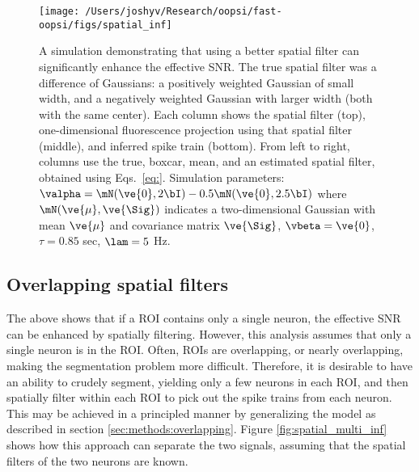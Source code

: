 \begin{figure}[h!]
\centering \texttt{[image: /Users/joshyv/Research/oopsi/fast-oopsi/figs/spatial\_inf]}
\caption[spatial filtering can improve effective SNR]{A simulation demonstrating that using a better spatial filter can significantly enhance the effective SNR. The true spatial filter was a difference of Gaussians: a positively weighted Gaussian of small width, and a negatively weighted Gaussian with larger width (both with the same center).  Each column shows the spatial filter (top), one-dimensional fluorescence projection using that spatial filter (middle), and inferred spike train (bottom).  From left to right, columns use the true, boxcar, mean, and an estimated spatial filter, obtained using Eqs.~\eqref{eq:}. Simulation parameters: $\valpha=\mN(\ve{0},2 \bI)-0.5 \mN(\ve{0},2.5 \bI)$ where $\mN(\ve{\mu},\ve{\Sig})$ indicates a two-dimensional Gaussian with mean $\ve{\mu}$ and covariance matrix $\ve{\Sig}$, $\vbeta=\ve{0}$, $\tau=0.85$ sec, $\lam=5$ Hz.} \label{fig:spatial} 
\end{figure}



\subsection{Overlapping spatial filters} \label{sec:results:overlapping}


The above shows that if a ROI contains only a single neuron, the effective SNR can be enhanced by spatially filtering.  However, this analysis assumes that only a single neuron is in the ROI.  Often, ROIs are overlapping, or nearly overlapping, making the segmentation problem more difficult.  Therefore, it is desirable to have an ability to crudely segment, yielding only a few neurons in each ROI, and then spatially filter within each ROI to pick out the spike trains from each neuron.  This may be achieved in a principled manner by generalizing the model as described in section \ref{sec:methods:overlapping}.  Figure \ref{fig:spatial_multi_inf} shows how this approach can separate the two signals, assuming that the spatial filters of the two neurons are known.  %

